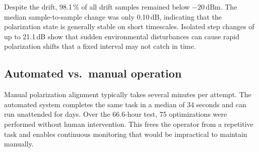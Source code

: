 Despite the drift, 98.1\,\% of all drift samples remained below $-20$\,dBm. The median sample-to-sample change was only 0.10\,dB, indicating that the polarization state is generally stable on short timescales. Isolated step changes of up to 21.1\,dB show that sudden environmental disturbances can cause rapid polarization shifts that a fixed interval may not catch in time.

\subsection{Automated vs.\ manual operation}

Manual polarization alignment typically takes several minutes per attempt. The automated system completes the same task in a median of 34 seconds and can run unattended for days. Over the 66.6-hour test, 75 optimizations were performed without human intervention. This frees the operator from a repetitive task and enables continuous monitoring that would be impractical to maintain manually.
